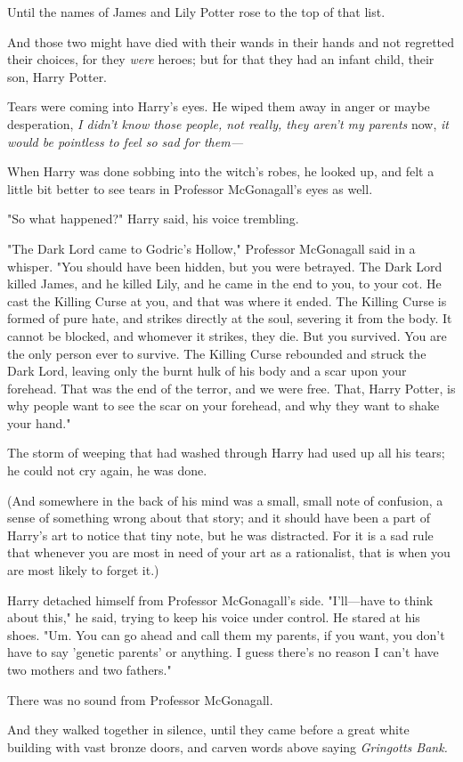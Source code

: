 Until the names of James and Lily Potter rose to the top of that list.

And those two might have died with their wands in their hands and not regretted 
their choices, for they \emph{were} heroes; but for that they had an infant 
child, their son, Harry Potter.

Tears were coming into Harry's eyes. He wiped them away in anger or maybe 
desperation, \emph{I didn't know those people, not really, they aren't my 
parents} now,\emph{ it would be pointless to feel so sad for them---}

When Harry was done sobbing into the witch's robes, he looked up, and felt a 
little bit better to see tears in Professor McGonagall's eyes as well.

"So what happened?" Harry said, his voice trembling.

"The Dark Lord came to Godric's Hollow," Professor McGonagall said in a 
whisper. "You should have been hidden, but you were betrayed. The Dark Lord 
killed James, and he killed Lily, and he came in the end to you, to your cot. 
He cast the Killing Curse at you, and that was where it ended. The Killing 
Curse is formed of pure hate, and strikes directly at the soul, severing it 
from the body. It cannot be blocked, and whomever it strikes, they die. But you 
survived. You are the only person ever to survive. The Killing Curse rebounded 
and struck the Dark Lord, leaving only the burnt hulk of his body and a scar 
upon your forehead. That was the end of the terror, and we were free. That, 
Harry Potter, is why people want to see the scar on your forehead, and why they 
want to shake your hand."

The storm of weeping that had washed through Harry had used up all his tears; 
he could not cry again, he was done.

(And somewhere in the back of his mind was a small, small note of confusion, a 
sense of something wrong about that story; and it should have been a part of 
Harry's art to notice that tiny note, but he was distracted. For it is a sad 
rule that whenever you are most in need of your art as a rationalist, that is 
when you are most likely to forget it.)

Harry detached himself from Professor McGonagall's side. "I'll---have to think 
about this," he said, trying to keep his voice under control. He stared at his 
shoes. "Um. You can go ahead and call them my parents, if you want, you don't 
have to say 'genetic parents' or anything. I guess there's no reason I can't 
have two mothers and two fathers."

There was no sound from Professor McGonagall.

And they walked together in silence, until they came before a great white 
building with vast bronze doors, and carven words above saying \emph{Gringotts 
Bank.}